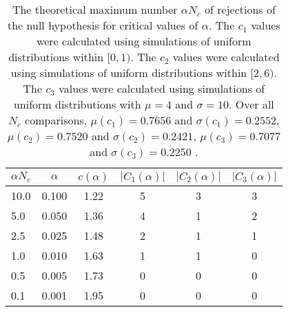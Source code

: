 \begin{table}[h!]
\begin{center}
\begin{tabular}{| l | c | c | c | c | c |}\hline
$\alpha N_c$ & $\alpha$ & $c(\alpha)$ & $|C_1(\alpha)|$ & $|C_2(\alpha)|$ & $|C_3(\alpha)|$ \\\hline
10.0 & 0.100 & 1.22 & 5 & 3 & 3 \\\hline
5.0 & 0.050 & 1.36 & 4 & 1 & 2 \\\hline
2.5 & 0.025 & 1.48 & 2 & 1 & 1 \\\hline
1.0 & 0.010 & 1.63 & 1 & 1 & 0 \\\hline
0.5 & 0.005 & 1.73 & 0 & 0 & 0 \\\hline
0.1 & 0.001 & 1.95 & 0 & 0 & 0 \\\hline
\end{tabular}
\caption{The theoretical maximum number $\alpha N_c$ of rejections
of the null hypothesis for critical values of $\alpha$.
The $c_1$ values were calculated using simulations of uniform distributions within $[0,1)$.
The $c_2$ values were calculated using simulations of uniform distributions within $[2,6)$.
The $c_3$ values were calculated using simulations of uniform distributions with $\mu=4$ and $\sigma=10$.
Over all $N_c$ comparisons,
 $\mu(c_1)=0.7656$ and $\sigma(c_1)=0.2552$,
 $\mu(c_2)=0.7520$ and $\sigma(c_2)=0.2421$,
 $\mu(c_3)=0.7077$ and $\sigma(c_3)=0.2250$ .
}
\end{center}
\end{table}